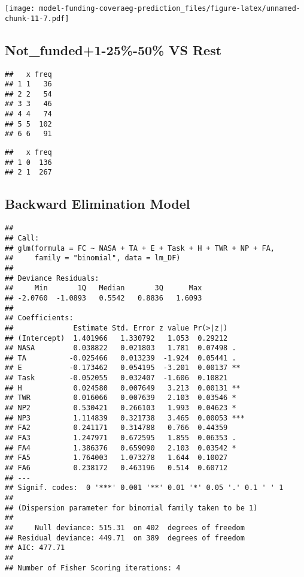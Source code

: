 \documentclass[]{article}
\begin{document}
\texttt{[image: model-funding-coveraeg-prediction\_files/figure-latex/unnamed-chunk-11-7.pdf]}

\newpage

\hypertarget{not_funded1-25-50-vs-rest}{%
\subsection{Not\_funded+1-25\%-50\% VS
Rest}\label{not_funded1-25-50-vs-rest}}

\begin{verbatim}
##   x freq
## 1 1   36
## 2 2   54
## 3 3   46
## 4 4   74
## 5 5  102
## 6 6   91
\end{verbatim}

\begin{verbatim}
##   x freq
## 1 0  136
## 2 1  267
\end{verbatim}

\hypertarget{backward-elimination-model-2}{%
\subsection{Backward Elimination
Model}\label{backward-elimination-model-2}}

\begin{verbatim}
## 
## Call:
## glm(formula = FC ~ NASA + TA + E + Task + H + TWR + NP + FA, 
##     family = "binomial", data = lm_DF)
## 
## Deviance Residuals: 
##     Min       1Q   Median       3Q      Max  
## -2.0760  -1.0893   0.5542   0.8836   1.6093  
## 
## Coefficients:
##              Estimate Std. Error z value Pr(>|z|)    
## (Intercept)  1.401966   1.330792   1.053  0.29212    
## NASA         0.038822   0.021803   1.781  0.07498 .  
## TA          -0.025466   0.013239  -1.924  0.05441 .  
## E           -0.173462   0.054195  -3.201  0.00137 ** 
## Task        -0.052055   0.032407  -1.606  0.10821    
## H            0.024580   0.007649   3.213  0.00131 ** 
## TWR          0.016066   0.007639   2.103  0.03546 *  
## NP2          0.530421   0.266103   1.993  0.04623 *  
## NP3          1.114839   0.321738   3.465  0.00053 ***
## FA2          0.241171   0.314788   0.766  0.44359    
## FA3          1.247971   0.672595   1.855  0.06353 .  
## FA4          1.386376   0.659090   2.103  0.03542 *  
## FA5          1.764003   1.073278   1.644  0.10027    
## FA6          0.238172   0.463196   0.514  0.60712    
## ---
## Signif. codes:  0 '***' 0.001 '**' 0.01 '*' 0.05 '.' 0.1 ' ' 1
## 
## (Dispersion parameter for binomial family taken to be 1)
## 
##     Null deviance: 515.31  on 402  degrees of freedom
## Residual deviance: 449.71  on 389  degrees of freedom
## AIC: 477.71
## 
## Number of Fisher Scoring iterations: 4
\end{verbatim}
\end{document}
